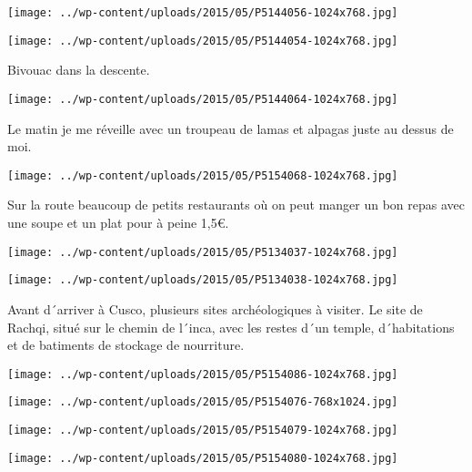  \newline
\centerline{\texttt{[image: ../wp-content/uploads/2015/05/P5144056-1024x768.jpg]} } 
 \newline
 \newline
\centerline{\texttt{[image: ../wp-content/uploads/2015/05/P5144054-1024x768.jpg]} } 
 \newline
 Bivouac dans la descente. \newline
 \newline
\centerline{\texttt{[image: ../wp-content/uploads/2015/05/P5144064-1024x768.jpg]} } 
 \newline
 Le matin je me réveille avec un troupeau de lamas et alpagas juste au dessus de moi. \newline
 \newline
\centerline{\texttt{[image: ../wp-content/uploads/2015/05/P5154068-1024x768.jpg]} } 
 \newline
 Sur la route beaucoup de petits restaurants où on peut manger un bon repas avec une soupe et un plat pour à peine 1,5€. \newline
 \newline
\centerline{\texttt{[image: ../wp-content/uploads/2015/05/P5134037-1024x768.jpg]} } 
 \newline
 \newline
\centerline{\texttt{[image: ../wp-content/uploads/2015/05/P5134038-1024x768.jpg]} } 
 \newline
 Avant d´arriver à Cusco, plusieurs sites archéologiques à visiter. \newline
 Le site de Rachqi, situé sur le chemin de l´inca, avec les restes d´un temple, d´habitations et de batiments de stockage de nourriture. \newline
 \newline
\centerline{\texttt{[image: ../wp-content/uploads/2015/05/P5154086-1024x768.jpg]} } 
 \newline
 \newline
\centerline{\texttt{[image: ../wp-content/uploads/2015/05/P5154076-768x1024.jpg]} } 
 \newline
 \newline
\centerline{\texttt{[image: ../wp-content/uploads/2015/05/P5154079-1024x768.jpg]} } 
 \newline
 \newline
\centerline{\texttt{[image: ../wp-content/uploads/2015/05/P5154080-1024x768.jpg]} } 
